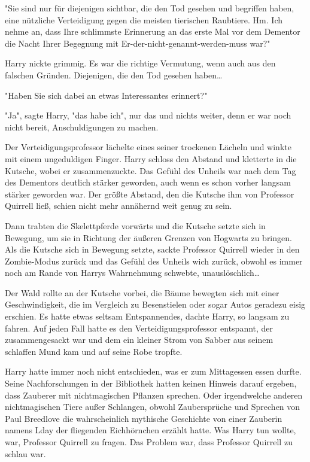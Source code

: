 {"Sie sind nur für diejenigen sichtbar, die den Tod gesehen und begriffen haben, eine nützliche Verteidigung gegen die meisten tierischen Raubtiere. Hm. Ich nehme an, dass Ihre schlimmste Erinnerung an das erste Mal vor dem Dementor die Nacht Ihrer Begegnung mit Er-der-nicht-genannt-werden-muss war?"

Harry nickte grimmig. Es war die richtige Vermutung, wenn auch aus den falschen Gründen. Diejenigen, die den Tod gesehen haben…

"Haben Sie sich dabei an etwas Interessantes erinnert?"

"Ja", sagte Harry, "das habe ich", nur das und nichts weiter, denn er war noch nicht bereit, Anschuldigungen zu machen.

Der Verteidigungsprofessor lächelte eines seiner trockenen Lächeln und winkte mit einem ungeduldigen Finger. Harry schloss den Abstand und kletterte in die Kutsche, wobei er zusammenzuckte. Das Gefühl des Unheils war nach dem Tag des Dementors deutlich stärker geworden, auch wenn es schon vorher langsam stärker geworden war. Der größte Abstand, den die Kutsche ihm von Professor Quirrell ließ, schien nicht mehr annähernd weit genug zu sein.

Dann trabten die Skelettpferde vorwärts und die Kutsche setzte sich in Bewegung, um sie in Richtung der äußeren Grenzen von Hogwarts zu bringen. Als die Kutsche sich in Bewegung setzte, sackte Professor Quirrell wieder in den Zombie-Modus zurück und das Gefühl des Unheils wich zurück, obwohl es immer noch am Rande von Harrys Wahrnehmung schwebte, unauslöschlich…

Der Wald rollte an der Kutsche vorbei, die Bäume bewegten sich mit einer Geschwindigkeit, die im Vergleich zu Besenstielen oder sogar Autos geradezu eisig erschien. Es hatte etwas seltsam Entspannendes, dachte Harry, so langsam zu fahren. Auf jeden Fall hatte es den Verteidigungsprofessor entspannt, der zusammengesackt war und dem ein kleiner Strom von Sabber aus seinem schlaffen Mund kam und auf seine Robe tropfte.

Harry hatte immer noch nicht entschieden, was er zum Mittagessen essen durfte. Seine Nachforschungen in der Bibliothek hatten keinen Hinweis darauf ergeben, dass Zauberer mit nichtmagischen Pflanzen sprechen. Oder irgendwelche anderen nichtmagischen Tiere außer Schlangen, obwohl Zaubersprüche und Sprechen von Paul Breedlove die wahrscheinlich mythische Geschichte von einer Zauberin namens Lday der fliegenden Eichhörnchen erzählt hatte. Was Harry tun wollte, war, Professor Quirrell zu fragen. Das Problem war, dass Professor Quirrell zu schlau war.

}
